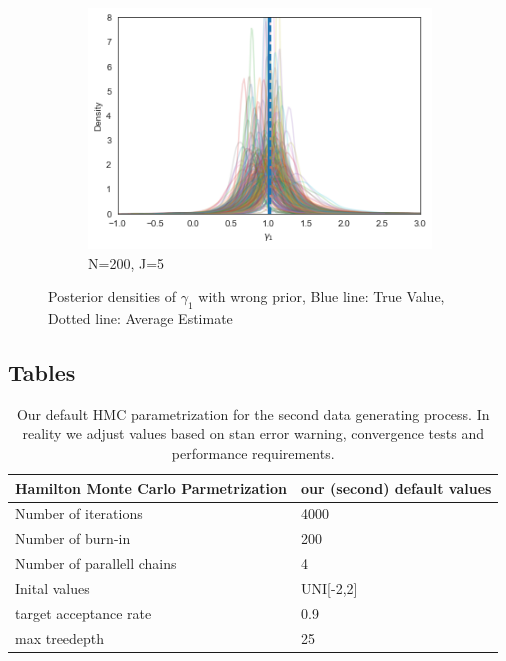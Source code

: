 \begin{figure}[H]
  \begin{subfigure}[b]{0.3\linewidth}
    \includegraphics[width=\linewidth]{graphics/posterior_plot_gamma1_wrong_smallJ}
    \caption{N=200, J=5}
  \end{subfigure}
  \caption{Posterior densities of $\gamma_1$ with wrong prior, Blue line: True Value, Dotted line: Average Estimate}
  \label{fig:posterior_wrong_gamma1}
\end{figure}

\subsection{Tables}

\begin{table}[H]
\begin{center}
\begin{tabular}{l l}
Hamilton Monte Carlo Parmetrization & our (second) default values\\
\hline
Number of iterations &4000  \\
Number of burn-in & 200 \\
Number of parallell chains & 4  \\
Inital values & UNI[-2,2]  \\
target acceptance rate & 0.9  \\
max treedepth & 25 \\
\end{tabular}
\end{center}
\caption{Our default HMC parametrization for the second data generating process. In reality we adjust values based on stan error warning, convergence tests and performance requirements.}
\label{tab:default_1}
\end{table}

